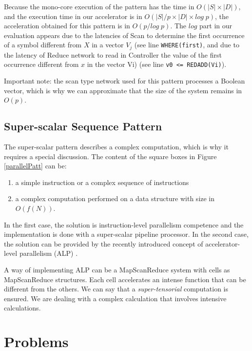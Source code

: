 Because the mono-core execution of the pattern has the time in $O(|S| \times |D|)$, and the execution time in our accelerator is in $O(|S|/p \times |D| \times log \; p)$, the acceleration obtained for this pattern is in $O(p/log \; p)$. The  $log$ part in our evaluation appears due to the latencies of Scan to determine the first occurrence of a symbol different from $X$ in a vector $V_j$ (see line {\tt WHERE(first)}, and due to the latency of Reduce network to read in Controller the value of the first occurrence different from $x$ in the vector Vi) (see line {\tt v0 <= REDADD(Vi)}).

Important note: the scan type network used for this pattern processes a Boolean vector, which is why we can approximate that the size of the system remains in $O(p)$.

\subsection{Super-scalar Sequence Pattern}

The super-scalar pattern describes a complex computation, which is why it requires a special discussion. The content of the square boxes in Figure \ref{parallelPatt} can be:
\begin{enumerate}
\item a simple instruction or a complex sequence of instructions
\item a complex computation performed on a data structure with size in $O(f(N))$.
\end{enumerate}
In the first case, the solution is  instruction-level parallelism competence and the implementation is done with a super-scalar pipeline processor. In the second case, the solution can be provided by the recently introduced concept of accelerator-level parallelism (ALP) \cite{HillReddi21} \cite{Malita22}.

A way of implementing ALP can be a MapScanReduce system with cells as MapScanReduce structures. Each cell accelerates an intense function that can be different from the others. We can say that a {\em super-tensorial} computation is ensured. We are dealing with a complex calculation that involves intensive calculations.

\section{Problems}


